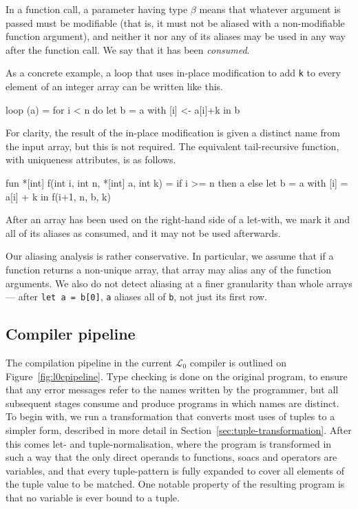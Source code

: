 \documentclass{sigplanconf}  %
\newcommand{\LO}{$\mathcal{L}_0$}
\begin{document}
In a function call, a parameter having type {\tt *$\beta$} means that
whatever argument is passed must be modifiable (that is, it must not
be aliased with a non-modifiable function argument), and neither it
nor any of its aliases may be used in any way after the function call.
We say that it has been {\em consumed}.

As a concrete example, a loop that uses in-place modification to add
{\tt k} to every element of an integer array can be written like this.

\begin{colorcode}
loop (a) = for i < n do
             let b = a with [i] <- a[i]+k in b
\end{colorcode}

For clarity, the result of the in-place modification is given a
distinct name from the input array, but this is not required.  The
equivalent tail-recursive function, with uniqueness attributes, is as
follows.

\begin{colorcode}
fun *[int] f(int i, int n, *[int] a, int k) =
  if i >= n then a
            else let b = a with [i] = a[i] + k in
                 f(i+1, n, b, k)
\end{colorcode}

After an array has been used on the right-hand side of a let-with, we
mark it and all of its aliases as consumed, and it may not be used
afterwards.

Our aliasing analysis is rather conservative.  In particular, we
assume that if a function returns a non-unique array, that array may
alias any of the function arguments.  We also do not detect aliasing
at a finer granularity than whole arrays --- after {\tt let a = b[0]},
{\tt a} aliases all of {\tt b}, not just its first row.

\subsection{Compiler pipeline}
\label{sec:compiler-pipeline}

The compilation pipeline in the current \LO{} compiler is outlined on
Figure~\ref{fig:l0cpipeline}.  Type checking is done on the original
program, to ensure that any error messages refer to the names written
by the programmer, but all subsequent stages consume and produce
programs in which names are distinct.  To begin with, we run a
transformation that converts most uses of tuples to a simpler form,
described in more detail in Section~\ref{sec:tuple-transformation}.
After this comes let- and tuple-normalisation, where the program is
transformed in such a way that the only direct operands to functions,
{\sc soac}s and operators are variables, and that every tuple-pattern
is fully expanded to cover all elements of the tuple value to be
matched.  One notable property of the resulting program is that no
variable is ever bound to a tuple.
\end{document}
